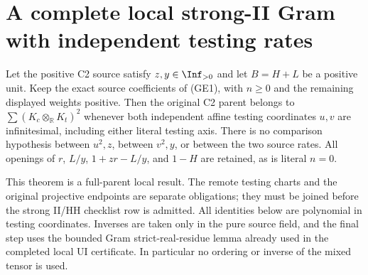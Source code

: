 \section{A complete local strong-II Gram with independent testing rates}
\label{sec:r7-local-strong-II}

\begin{theorem}
Let the positive C2 source satisfy $z,y\in\Inf_{>0}$ and let
$B=H+L$ be a positive unit.  Keep the exact source coefficients of
(GE1), with $n\geq0$ and the remaining displayed weights positive.
Then the original C2 parent belongs to $\sum(K_c\otimes_{\mathbb R}
K_t)^2$ whenever both independent affine testing coordinates $u,v$
are infinitesimal, including either literal testing axis.
There is no comparison hypothesis between $u^2,z$, between $v^2,y$,
or between the two source rates.  All openings of $r$, $L/y$,
$1+zr-L/y$, and $1-H$ are retained, as is literal $n=0$.
\end{theorem}

This theorem is a full-parent local result.  The remote testing charts
and the original projective endpoints are separate obligations; they
must be joined before the strong II/HH checklist row is admitted.
All identities below are polynomial in testing coordinates.  Inverses
are taken only in the pure source field, and the final step uses the
bounded Gram strict-real-residue lemma already used in the completed
local UI certificate.  In particular no ordering or inverse of the
mixed tensor is used.

